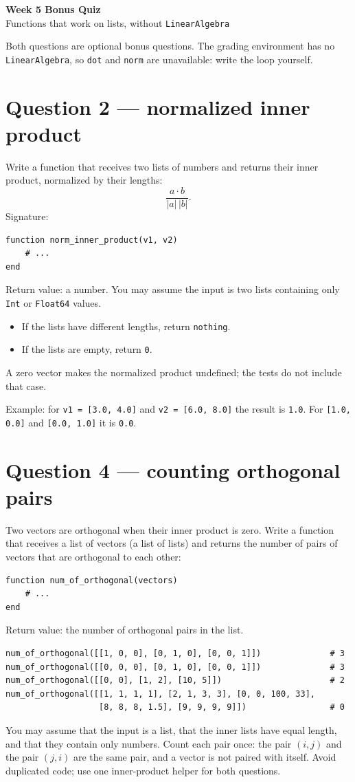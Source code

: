 \documentclass[11pt]{article}
\begin{document}
\begin{center}
{\LARGE\sffamily\bfseries\color{deepblue} Week 5 Bonus Quiz}\\[.2cm]
{\large Functions that work on lists, without \texttt{LinearAlgebra}}
\end{center}

\noindent Both questions are optional bonus questions. The grading environment has
no \texttt{LinearAlgebra}, so \texttt{dot} and \texttt{norm} are unavailable: write
the loop yourself.

\section*{Question 2 --- normalized inner product}
Write a function that receives two lists of numbers and returns their inner
product, normalized by their lengths:
\[
\frac{a\cdot b}{|a|\,|b|}.
\]
Signature:
\begin{lstlisting}
function norm_inner_product(v1, v2)
    # ...
end
\end{lstlisting}
Return value: a number. You may assume the input is two lists containing only
\texttt{Int} or \texttt{Float64} values.
\begin{itemize}
\item If the lists have different lengths, return \texttt{nothing}.
\item If the lists are empty, return \texttt{0}.
\end{itemize}
A zero vector makes the normalized product undefined; the tests do not include
that case.

Example: for \texttt{v1 = [3.0, 4.0]} and \texttt{v2 = [6.0, 8.0]} the result is
\texttt{1.0}. For \texttt{[1.0, 0.0]} and \texttt{[0.0, 1.0]} it is \texttt{0.0}.

\section*{Question 4 --- counting orthogonal pairs}
Two vectors are orthogonal when their inner product is zero. Write a function
that receives a list of vectors (a list of lists) and returns the number of pairs
of vectors that are orthogonal to each other:
\begin{lstlisting}
function num_of_orthogonal(vectors)
    # ...
end
\end{lstlisting}
Return value: the number of orthogonal pairs in the list.

\begin{lstlisting}
num_of_orthogonal([[1, 0, 0], [0, 1, 0], [0, 0, 1]])              # 3
num_of_orthogonal([[0, 0, 0], [0, 1, 0], [0, 0, 1]])              # 3
num_of_orthogonal([[0, 0], [1, 2], [10, 5]])                      # 2
num_of_orthogonal([[1, 1, 1, 1], [2, 1, 3, 3], [0, 0, 100, 33],
                   [8, 8, 8, 1.5], [9, 9, 9, 9]])                 # 0
\end{lstlisting}
You may assume that the input is a list, that the inner lists have equal length,
and that they contain only numbers. Count each pair once: the pair $(i,j)$ and
the pair $(j,i)$ are the same pair, and a vector is not paired with itself.
Avoid duplicated code; use one inner-product helper for both questions.
\end{document}
